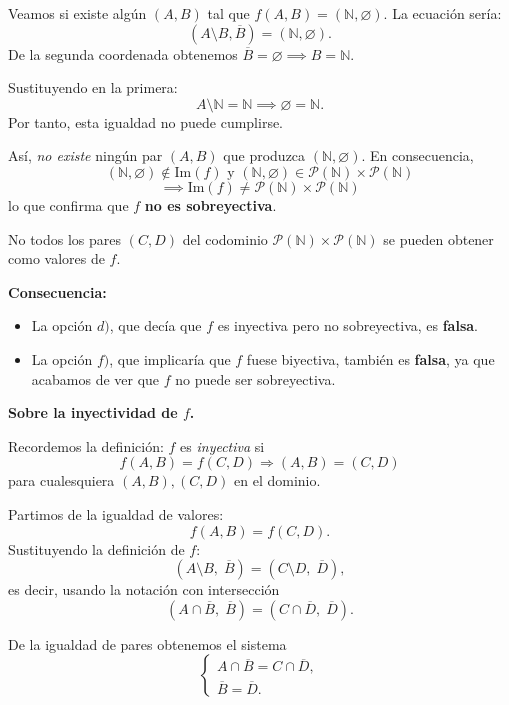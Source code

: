 \documentclass[a4paper,12pt]{article}
\begin{document}
\begin{ejercicioExamen}[title=Ejercicio 1]

Veamos si existe algún \((A,B)\) tal que \(f(A,B) = (\mathbb{N}, \varnothing)\).  
La ecuación sería:
\[
(A \setminus B, \overline{B}) = (\mathbb{N}, \varnothing).
\]
De la segunda coordenada obtenemos \(\overline{B} = \varnothing \implies B = \mathbb{N}\).

Sustituyendo en la primera:
\[
A \setminus \mathbb{N} = \mathbb{N} \implies \varnothing = \mathbb{N}.
\]
Por tanto, esta igualdad no puede cumplirse.

\medskip
Así, \emph{no existe} ningún par \((A,B)\) que produzca \((\mathbb{N}, \varnothing)\).  
En consecuencia,
\[
(\mathbb{N}, \varnothing) \notin \mathrm{Im}(f) \text{ y } (\mathbb{N}, \varnothing) \in \mathcal{P}(\mathbb{N}) \times \mathcal{P}(\mathbb{N}) \]
\[\implies \mathrm{Im}(f) \ne \mathcal{P}(\mathbb{N}) \times \mathcal{P}(\mathbb{N})
\]
lo que confirma que \(f\) \textbf{no es sobreyectiva}.

No todos los pares \((C,D)\) del codominio \(\mathcal{P}(\mathbb{N}) \times \mathcal{P}(\mathbb{N})\) se pueden obtener como valores de \(f\).  

\medskip
\textbf{Consecuencia:}
\begin{itemize}
    \item La opción $d)$, que decía que \(f\) es inyectiva pero no sobreyectiva, es \textbf{falsa}.
    \item La opción $f)$, que implicaría que \(f\) fuese biyectiva, también es \textbf{falsa}, ya que acabamos de ver que \(f\) no puede ser sobreyectiva.
\end{itemize}

\medskip
\textbf{Sobre la inyectividad de \(f\).}

Recordemos la definición: \(f\) es \emph{inyectiva} si
\[
f(A,B) = f(C,D) \Longrightarrow (A,B) = (C,D)
\]
para cualesquiera \((A,B),(C,D)\) en el dominio.

Partimos de la igualdad de valores:
\[
f(A,B) = f(C,D).
\]
Sustituyendo la definición de \(f\):
\[
(A \setminus B,\; \overline{B}) = (C \setminus D,\; \overline{D}),
\]
es decir, usando la notación con intersección
\[
(A \cap \overline{B},\; \overline{B}) = (C \cap \overline{D},\; \overline{D}).
\]

De la igualdad de pares obtenemos el sistema
\[
\begin{cases}
A \cap \overline{B} = C \cap \overline{D},\\[2mm]
\overline{B} = \overline{D}.
\end{cases}
\]

\end{ejercicioExamen}
\end{document}
